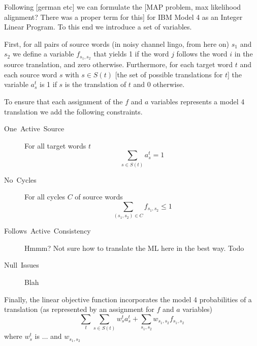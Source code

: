 
Following {[}german etc{]} we can formulate the {[}MAP problem, max
likelihood alignment? There was a proper term for this{]} for IBM
Model 4 as an Integer Linear Program. To this end we introduce a set
of variables. 

First, for all pairs of source words (in noisy channel lingo, from
here on) $s_{1}$ and $s_{2}$ we define a variable $f_{s_{1},s_{2}}$
that yields 1 if the word $j$ follows the word $i$ in the source
translation, and zero otherwise. Furthermore, for each target word
$ $$t$ and each source word $s$ with $s\in S\left(t\right)$ {[}the
set of possible translations for $t${]} the variable $a_{s}^{t}$
is 1 if $s$ is the translation of $t$ and 0 otherwise. 

To ensure that each assignment of the $f$ and $a$ variables represents
a model 4 translation we add the following constraints.
\begin{description}
\item [{One~Active~Source}] For all target words $t$\[
\sum_{s\in S\left(t\right)}a_{s}^{t}=1\]

\item [{No~Cycles}] For all cycles $C$ of source words\[
\sum_{\left(s_{1},s_{2}\right)\in C}f_{s_{1},s_{2}}\leq1\]

\item [{Follows~Active~Consistency}] Hmmm? Not sure how to translate
the ML here in the best way. Todo
\item [{Null~Issues}] Blah
\end{description}
Finally, the linear objective function incorporates the model 4 probabilities
of a translation (as represented by an assignment for $f$ and $a$
variables) \[
\sum_{t}\sum_{s\in S\left(t\right)}w_{s}^{t}a_{s}^{t}+\sum_{s_{1},s_{2}}w_{s_{1},s_{2}}f_{s_{1},s_{2}}\]
 where $w_{s}^{t}$ is $\ldots$ and $w_{s_{1},s_{2}}$